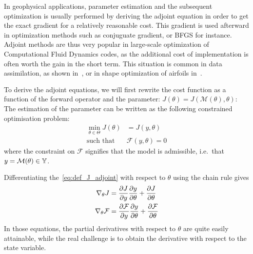 \documentclass[../../Main_ManuscritThese.tex]{subfiles}
\begin{document}
In geophysical applications, parameter estimation and the subsequent optimization is usually performed by deriving the adjoint equation in order to get the exact gradient for a relatively reasonable cost. This gradient is used afterward in optimization methods such as conjuguate gradient, or BFGS for instance. Adjoint methods are thus very popular in large-scale optimization of Computational Fluid Dynamics codes, as the additional cost of implementation is often worth the gain in the short term. This situation is common in data assimilation, as shown in~\cite{das_estimation_1991,das_variational_1992,honnorat_identification_2010,couderc_dassfow-shallow_2013}, or in shape optimization of airfoils in~\cite{huyse_free-form_2001}.

To derive the adjoint equations, we will first rewrite the cost function as a function of the forward operator and the parameter: $J(\theta) = J(\mathcal{M}(\theta),\theta)$:
The estimation of the parameter can be written as the following constrained optimisation problem:
\begin{equation}
  \begin{aligned}
  \min_{\theta \in \Theta} J(\theta) &= J(y, \theta) \label{eq:def_J_adjoint} \\
  \text{such that } &\mathcal{F}(y, \theta) = 0 %
  \end{aligned}
\end{equation}
where the constraint on $\mathcal{F}$ signifies that the model is admissible, i.e.\ that $y = \mathcal{M}(\theta)\in \mathbb{Y}$.

 Differentiating the~\cref{eq:def_J_adjoint} with respect to $\theta$ using the chain rule gives
\begin{equation}
  \begin{aligned}
  \nabla_\theta J &= \frac{\partial J}{\partial y} \frac{\partial y}{\partial \theta} + \frac{\partial J}{\partial \theta}\\
    \nabla_\theta \mathcal{F} &= \frac{\partial \mathcal{F}}{\partial y} \frac{\partial y}{\partial \theta} + \frac{\partial \mathcal{F}}{\partial \theta}
  \end{aligned} \label{eq:aze}
\end{equation}
In those equations, the partial derivatives with respect to $\theta$ are quite easily attainable, while the real challenge is to obtain the derivative with respect to the state variable.
\end{document}
